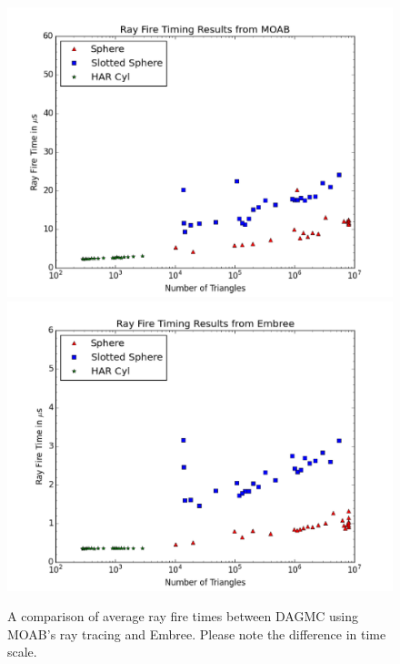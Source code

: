 \documentclass[12pt, a4paper]{article}
\begin{document}
\begin{figure}[H]
  \vspace{-3cm}
  \centering
  \includegraphics[scale=0.33]{Eig_fix_rf.png}
  \includegraphics[scale=0.33]{embree_rf.png}
  \caption{A comparison of average ray fire times between DAGMC using MOAB's ray tracing and Embree. Please note the difference in time scale.}
  \label{emdag_timing_compare}
\end{figure}
\newpage
\end{document}
